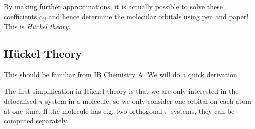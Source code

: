 \documentclass{article}
\theoremstyle{plain}\theoremheaderfont{\normalfont\itshape}\theorembodyfont{\rmfamily}\theoremseparator{.}\newtheorem*{rem}{Remark}\newtheorem*{ex}{Example}\newtheorem*{proof}{Proof}\newtheorem*{altp}{Alternative proof}
\theoremstyle{plain}\theoremheaderfont{\normalfont\bfseries}\theorembodyfont{\rmfamily}\theoremseparator{.}\newtheorem{thm}{Theorem}[section]\newtheorem{lem}[thm]{Lemma}\newtheorem{prop}[thm]{Proposition}\newtheorem*{cor}{Corollary}\newtheorem{defn}[thm]{Definition}\newtheorem{clm}[thm]{Claim}\newtheorem{clminproof}{Claim}\newtheorem{pos}{Postulate}[section]
\theoremstyle{break}\theoremheaderfont{\normalfont\itshape}\theorembodyfont{\rmfamily}\theoremseparator{.\medskip}\newtheorem*{proofskip}{Proof}\newtheorem*{exs}{Examples}\newtheorem*{rems}{Remarks}
\theoremstyle{break}\theoremheaderfont{\normalfont\bfseries}\theorembodyfont{\rmfamily}\theoremseparator{.\medskip}\newtheorem{lemskip}[thm]{Lemma}\newtheorem{defnskip}[thm]{Definition}\newtheorem{propskip}[thm]{Proposition}\newtheorem{thmskip}[thm]{Theorem}
\numberwithin{equation}{section}
\begin{document}
    By making further approximations, it is actually possible to solve these coefficients \(c_{ij}\) and hence determine the molecular orbitals using pen and paper! This is \textit{H\"{u}ckel theory}.

    \subsection{H\"{u}ckel Theory}
    This should be familiar from IB Chemistry A. We will do a quick derivation.

    The first simplification in H\"{u}ckel theory is that we are only interested in the delocalised \(\pi\) system in a molecule, so we only consider one orbital on each atom at one time. If the molecule has e.g. two orthogonal \(\pi\) systems, they can be computed separately.
\end{document}
